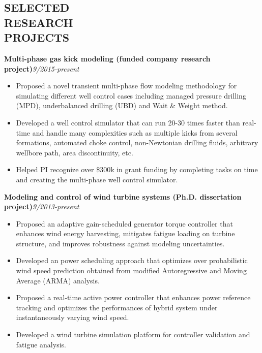 \documentclass[margin, 9pt]{res} %
\begin{document}
\begin{resume}
\section{SELECTED\\ RESEARCH\\ PROJECTS}
{\textbf{Multi-phase gas kick modeling  (funded company research project)}}\hfill\textit{9/2015-present}\\
\vspace*{-10pt}
\begin{itemize}[leftmargin=*] \itemsep -3pt
\vspace*{-5pt}
	\item Proposed a novel transient multi-phase flow modeling methodology for simulating different well control cases including managed pressure drilling (MPD), underbalanced drilling (UBD) and Wait \& Weight method.
	\item Developed a well control simulator that can run 20-30 times faster than real-time and handle many complexities such as multiple kicks from several formations,  automated choke control,  non-Newtonian drilling fluids, arbitrary wellbore path, area discontinuity, etc.
    \item Helped PI recognize over \$300k in grant funding by completing tasks on time and creating the multi-phase well control simulator. 
\end{itemize}

\medskip
{\textbf{Modeling and control of wind turbine systems (Ph.D. dissertation project)}}\hfill\textit{9/2013-present}\\
\vspace*{-10pt}
\begin{itemize}[leftmargin=*] \itemsep -3pt
\vspace*{-5pt}
    \item Proposed an adaptive gain-scheduled generator torque controller that enhances wind energy harvesting, mitigates fatigue loading on turbine structure, and improves robustness against modeling uncertainties.
	\item Developed an  power scheduling approach that optimizes over probabilistic wind speed prediction obtained from modified Autoregressive and Moving Average (ARMA) analysis.
	\item Proposed a real-time active power controller that enhances power reference tracking and optimizes the performances of hybrid system under instantaneously varying wind speed.
    \item Developed a wind turbine simulation platform  for controller validation and fatigue analysis.
\end{itemize}


\end{resume}
\end{document}

